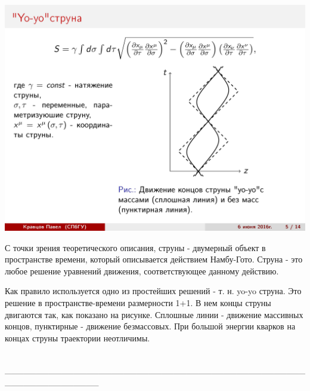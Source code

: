 \documentclass[14pt]{article}
\renewcommand{\line}{\\ \_\_\_\_\_\_\_\_\_\_\_\_\_\_\_\_\_\_\_\_\_\_\_\_\_\_\_\_\_\_\_\_\_\_\_\_\_\_\_\_\_\_\_\_\_\_\_\_\_\_\_\_\_\_\_\_\_\_\_\_\_\_\_ \\ }
\begin{document}
\begin{minipage}[h]{0.5\linewidth}
\includegraphics[width=1\linewidth]{page-05.jpg}
\end{minipage}
\begin{minipage}[h]{0.45\linewidth}
С точки зрения теоретического описания, струны - двумерный объект в пространстве времени, который описывается действием Намбу-Гото. Струна - это любое решение уравнений движения, соответствующее данному действию.

Как правило используется одно из простейших решений - т. н. yo-yo струна. Это решение в пространстве-времени размерности 1+1. В нем концы струны двигаются так, как показано на рисунке. Сплошные линии - движение массивных концов, пунктирные - движение безмассовых. При большой энергии кварков на концах струны траектории неотличимы.
\end{minipage}
\line
\end{document}

